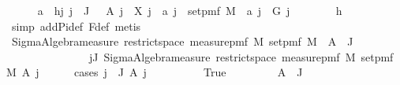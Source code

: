 \begin{isabellebody}
\ \ \ \ \isamarkupfalse%
\ a\ \ h{}{\isacharcolon}{\kern0pt}{\isachardoublequoteopen}{\isasymAnd}j{\isachardot}{\kern0pt}\ j\ {\isasymin}\ J\ \ {\isasymLongrightarrow}\ A\ j\ {\isacharequal}{\kern0pt}\ X\ j\ {\isacharminus}{\kern0pt}{\isacharbackquote}{\kern0pt}\ a\ j\ {\isasyminter}\ set{\isacharunderscore}{\kern0pt}pmf\ M\ {\isasymand}\ a\ j\ {\isasymin}\ G\ j{\isachardoublequoteclose}\isanewline
\ \ \ \ \ \ \isamarkupfalse%
\ h{}\ \isamarkupfalse%
\ {\isacharparenleft}{\kern0pt}simp\ add{\isacharcolon}{\kern0pt}Pi{\isacharunderscore}{\kern0pt}def\ F{\isacharunderscore}{\kern0pt}def{\isacharcomma}{\kern0pt}\ metis{\isacharparenright}{\kern0pt}\isanewline
\isanewline
\ \ \ \ \isamarkupfalse%
\ {\isachardoublequoteopen}Sigma{\isacharunderscore}{\kern0pt}Algebra{\isachardot}{\kern0pt}measure\ {\isacharparenleft}{\kern0pt}restrict{\isacharunderscore}{\kern0pt}space\ {\isacharparenleft}{\kern0pt}measure{\isacharunderscore}{\kern0pt}pmf\ M{\isacharparenright}{\kern0pt}\ {\isacharparenleft}{\kern0pt}set{\isacharunderscore}{\kern0pt}pmf\ M{\isacharparenright}{\kern0pt}{\isacharparenright}{\kern0pt}\ {\isacharparenleft}{\kern0pt}{\isasymInter}\ {\isacharparenleft}{\kern0pt}A\ {\isacharbackquote}{\kern0pt}\ J{\isacharparenright}{\kern0pt}{\isacharparenright}{\kern0pt}\ {\isacharequal}{\kern0pt}\isanewline
\ \ \ \ \ \ \ \ \ \ \ \ \ \ \ {\isacharparenleft}{\kern0pt}{\isasymProd}j{\isasymin}J{\isachardot}{\kern0pt}\ Sigma{\isacharunderscore}{\kern0pt}Algebra{\isachardot}{\kern0pt}measure\ {\isacharparenleft}{\kern0pt}restrict{\isacharunderscore}{\kern0pt}space\ {\isacharparenleft}{\kern0pt}measure{\isacharunderscore}{\kern0pt}pmf\ M{\isacharparenright}{\kern0pt}\ {\isacharparenleft}{\kern0pt}set{\isacharunderscore}{\kern0pt}pmf\ M{\isacharparenright}{\kern0pt}{\isacharparenright}{\kern0pt}\ {\isacharparenleft}{\kern0pt}A\ j{\isacharparenright}{\kern0pt}{\isacharparenright}{\kern0pt}{\isachardoublequoteclose}\isanewline
\ \ \ \ \isamarkupfalse%
\ {\isacharparenleft}{\kern0pt}cases\ {\isachardoublequoteopen}{\isasymexists}j\ {\isasymin}\ J{\isachardot}{\kern0pt}\ A\ j\ {\isacharequal}{\kern0pt}\ {\isacharbraceleft}{\kern0pt}{\isacharbraceright}{\kern0pt}{\isachardoublequoteclose}{\isacharparenright}{\kern0pt}\isanewline
\ \ \ \ \ \ \isamarkupfalse%
\ True\isanewline
\ \ \ \ \ \ \isamarkupfalse%
\ {\isachardoublequoteopen}{\isasymInter}\ {\isacharparenleft}{\kern0pt}A\ {\isacharbackquote}{\kern0pt}\ J{\isacharparenright}{\kern0pt}\ {\isacharequal}{\kern0pt}\ {\isacharbraceleft}{\kern0pt}{\isacharbraceright}{\kern0pt}{\isachardoublequoteclose}\ \isamarkupfalse%

\end{isabellebody}
